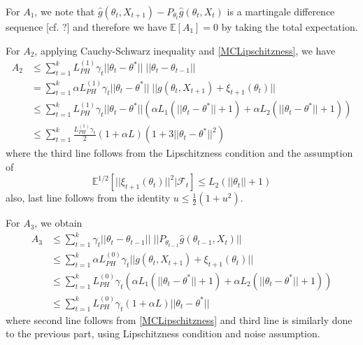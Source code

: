 \documentclass[a4paper]{article}
\begin{document}
For $A_{1}$, we note that $\hat{g}\left(\theta_{t}, X_{t + 1}\right) - P_{\theta_{t}}\hat{g}\left(\theta_{t}, X_{t}\right)$ is a martingale difference sequence [cf. ?] and therefore we have $\mathbb{E}[A_{1}] = 0$ by taking the total expectation.

For $A_{2}$, applying Cauchy-Schwarz inequality and \ref{MCLipschitzness}, we have
\begin{equation}
	\begin{split}
		A_{2} & \le \sum_{t = 1}^{k}L_{PH}^{(1)}\gamma_{t}||\theta_{t} - \theta^{*}||\;||\theta_{t} - \theta_{t - 1}||\\
		& = \sum_{t = 1}^{k}\alpha L_{PH}^{(1)}\gamma_{t}||\theta_{t} - \theta^{*}||\;||g(\theta_{t}, X_{t + 1}) + \xi_{t +‌1}(\theta_{t})||\\
		& \le \sum_{t = 1}^{k}L_{PH}^{(1)} \gamma_{t}||\theta_{t} - \theta^{*}||\left(\alpha L_{1}\left(||\theta_{t} - \theta^{*}|| + 1\right) + \alpha L_{2}\left(||\theta_{t} - \theta^{*}|| + 1\right)\right)\\
		& \le \sum_{t = 1}^{k}\frac{L_{PH}^{(1)}\gamma_{t}}{2}(1 + \alpha L)\left(1 + 3||\theta_{t} - \theta^{*}||^{2} \right)
	\end{split}
\end{equation}
where the third line follows from the Lipschitzness condition and the assumption of
$$\mathbb{E}^{1 / 2}\left[||\xi_{t + 1}\left(\theta_{t}\right)||^{2} | \mathcal{F}_{t}\right] \le L_{2}\left(||\theta_{t}|| + 1\right)$$
also, last line follows from the identity $u \le \frac{1}{2}(1 + u^{2})$.

For $A_{3}$, we obtain
\begin{equation}
	\begin{split}
		A_{3} & \le \sum_{t = 1}^{k}\gamma_{t}||\theta_{t} - \theta_{t - 1}|| \; ||P_{\theta_{t - 1}}\hat{g}\left(\theta_{t - 1}, X_{t}\right)||\\
		& \le \sum_{t = 1}^{k}\alpha L_{PH}^{(0)}\gamma_{t}||g\left(\theta_{t}, X_{t + 1}\right)‌ + \xi_{t + 1}(\theta_{t})||\\
		& \le \sum_{t = 1}^{k}L_{PH}^{(0)}\gamma_{t}\left(\alpha L_{1}\left(||\theta_{t} - \theta^{*}|| + 1\right) + \alpha L_{2}\left(||\theta_{t} - \theta^{*}|| + 1\right)\right)\\
		& \le \sum_{t = 1}^{k}L_{PH}^{(0)}\gamma_{t}(1 + \alpha L)||\theta_{t} - \theta^{*}||
	\end{split}
\end{equation}
where second line follows from \ref{MCLipschitzness} and third line is similarly done to the previous part, using Lipschitzness condition and noise assumption.
\end{document}
